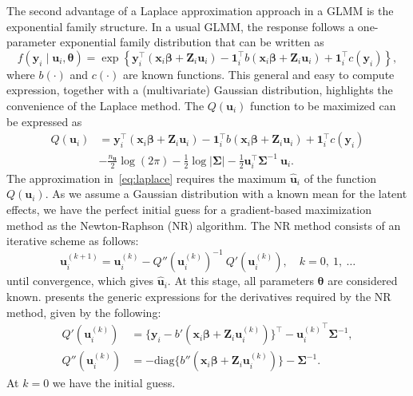 The second advantage of a Laplace approximation approach in a GLMM is
the exponential family structure. In a usual GLMM, the response follows
a one-parameter exponential family distribution that can be written as
\[
  f(\mathbf{y}_{i} \mid \mathbf{u}_{i}, \bm{\theta}) = \exp
  \left\{\mathbf{y}_{i}^{\top}
    (\bm{x}_{i}\bm{\beta} + \mathbf{Z}_{i}\mathbf{u}_{i}) -
    \mathbf{1}_{i}^{\top}
    b(\bm{x}_{i}\bm{\beta} + \mathbf{Z}_{i}\mathbf{u}_{i}) +
    \mathbf{1}_{i}^{\top} c(\mathbf{y}_{i})
  \right\},
\]
where \(b(\cdot)\) and \(c(\cdot)\) are known functions. This general
and easy to compute expression, together with a (multivariate) Gaussian
distribution, highlights the convenience of the Laplace method. The
\(Q(\mathbf{u}_{i})\) function to be maximized can be expressed as
\begin{equation}
  \begin{aligned}
    Q(\mathbf{u}_{i}) &= \mathbf{y}_{i}^{\top}
    (\bm{x}_{i}\bm{\beta} + \mathbf{Z}_{i}\mathbf{u}_{i}) -
    \mathbf{1}_{i}^{\top}
    b(\bm{x}_{i}\bm{\beta} + \mathbf{Z}_{i}\mathbf{u}_{i}) +
    \mathbf{1}_{i}^{\top} c(\mathbf{y}_{i})\\
    &- \frac{n_{\mathbf{u}}}{2} \log (2\pi) -
    \frac{1}{2} \log |\bm{\Sigma}| -
    \frac{1}{2} \mathbf{u}_{i}^{\top}\bm{\Sigma}^{-1}~\mathbf{u}_{i}.
  \end{aligned}
\end{equation}
The approximation in~\autoref{eq:laplace} requires the maximum
\(\mathbf{\hat{u}}_{i}\) of the function \(Q(\mathbf{u}_{i})\). As we
assume a Gaussian distribution with a known mean for the latent effects,
we have the perfect initial guess for a gradient-based maximization
method as the Newton-Raphson (NR) algorithm. The NR method consists of
an iterative scheme as follows:
\[
  \mathbf{u}_{i}^{(k+1)} = \mathbf{u}_{i}^{(k)} -
  {Q}''(\mathbf{u}_{i}^{(k)})^{-1}~{Q}'(\mathbf{u}_{i}^{(k)}),
  \quad k = 0,~1,~\dots
\]
until convergence, which gives \(\mathbf{\hat{u}}_{i}\). At this stage,
all parameters \(\bm{\theta}\) are considered known. 
presents the generic expressions for the derivatives required by the NR
method, given by the following:
\begin{equation}
  \begin{aligned}
    {Q}'(\mathbf{u}_{i}^{(k)}) &= \{\mathbf{y}_{i} -
    {b}'(\bm{x}_{i}\bm{\beta} +
    \mathbf{Z}_{i}\mathbf{u}_{i}^{(k)})\}^{\top} -
    {\mathbf{u}_{i}^{(k)}}^{\top} \bm{\Sigma}^{-1},\\
    {Q}''(\mathbf{u}_{i}^{(k)}) &=
    - \text{diag}\{{b}''(\bm{x}_{i}\bm{\beta} +
    \mathbf{Z}_{i}\mathbf{u}_{i}^{(k)})\} - \bm{\Sigma}^{-1}.
  \end{aligned}
  \nonumber
\end{equation}
At \(k = 0\) we have the initial guess.

